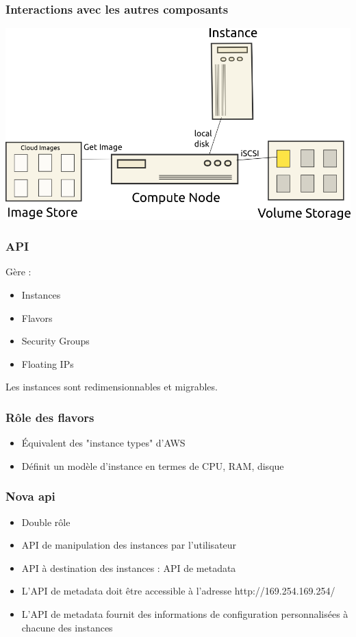   \begin{frame}
    \frametitle{Interactions avec les autres composants}
    \includegraphics[width=\textwidth]{images/compute-node.png}
  \end{frame}

  \begin{frame}
    \frametitle{API}
    Gère :
    \begin{itemize}
      \item Instances
      \item Flavors
      \item Security Groups
      \item Floating IPs
    \end{itemize}
    Les instances sont redimensionnables et migrables.
  \end{frame}

  \begin{frame}
    \frametitle{Rôle des flavors}
    \begin{itemize}
      \item Équivalent des "instance types" d'AWS
      \item Définit un modèle d'instance en termes de CPU, RAM, disque
    \end{itemize}
  \end{frame}

  \begin{frame}
    \frametitle{Nova api}
    \begin{itemize}
      \item Double rôle
      \item API de manipulation des instances par l'utilisateur
      \item API à destination des instances : API de metadata
      \item L'API de metadata doit être accessible à l'adresse http://169.254.169.254/
      \item L'API de metadata fournit des informations de configuration personnalisées à chacune des instances
    \end{itemize}
  \end{frame}

